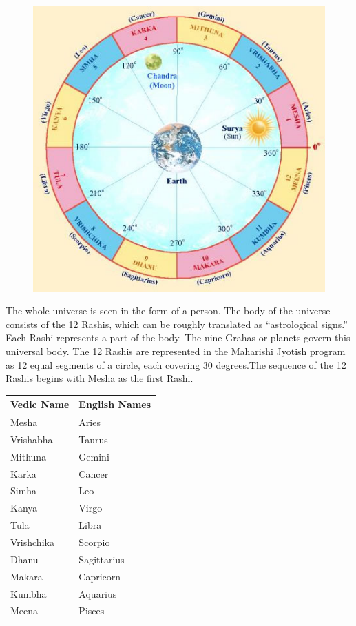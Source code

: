 \documentclass[12pt, right open]{memoir}
\begin{document}
\begin{figure}
\centering
\includegraphics[scale=1]{data/images/jyotish_rashis.jpg}
\end{figure}

The whole universe is seen in the form of a person. The body of the universe consists of the 12 Rashis, which can be roughly translated as “astrological signs.” Each Rashi represents a part of the body. The nine Grahas or planets govern this universal body. The 12 Rashis are represented in the Maharishi Jyotish program as 12 equal segments of a circle, each covering 30 degrees.The sequence of the 12 Rashis begins with Mesha as the first Rashi.

\begin{tabular}{|l | l|}
\hline
\textbf{Vedic Name} & \textbf{English Names} \\ \hline
 Mesha & Aries \\ \hline
 Vrishabha & Taurus\\ \hline
 Mithuna & Gemini\\ \hline
 Karka & Cancer\\ \hline
 Simha & Leo\\ \hline
 Kanya & Virgo\\ \hline
 Tula & Libra\\ \hline
 Vrishchika & Scorpio\\ \hline
 Dhanu & Sagittarius\\ \hline
 Makara & Capricorn\\ \hline
 Kumbha & Aquarius\\ \hline
 Meena & Pisces\\ \hline
\end{tabular}
\end{document}
